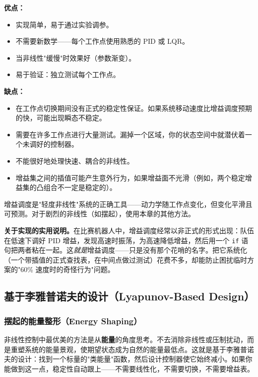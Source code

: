 \textbf{优点：}
\begin{itemize}[nosep]
    \item 实现简单，易于通过实验调参。
    \item 不需要新数学——每个工作点使用熟悉的 PID 或 LQR。
    \item 当非线性"缓慢"时效果好（参数渐变）。
    \item 易于验证：独立测试每个工作点。
\end{itemize}

\textbf{缺点：}
\begin{itemize}[nosep]
    \item 在工作点切换期间没有正式的稳定性保证。如果系统移动速度比增益调度预期的快，可能出现瞬态不稳定。
    \item 需要在许多工作点进行大量测试。漏掉一个区域，你的状态空间中就潜伏着一个未调好的控制器。
    \item 不能很好地处理快速、耦合的非线性。
    \item 增益集之间的插值可能产生意外行为，如果增益面不光滑（例如，两个稳定增益集的凸组合不一定是稳定的）。
\end{itemize}

增益调度是"轻度非线性"系统的正确工具——动力学随工作点变化，但变化平滑且可预测。对于剧烈的非线性（如摆起），使用本章的其他方法。

\textbf{关于实现的实用说明。}在比赛机器人中，增益调度经常以非正式的形式出现：队伍在低速下调好 PID 增益，发现高速时振荡，为高速降低增益，然后用一个 \texttt{if} 语句把两者粘在一起。这\textit{就是}增益调度——只是没有那个花哨的名字。把它系统化（一个带插值的正式查找表，在中间点做过测试）花费不多，却能防止困扰临时方案的"60\% 速度时的奇怪行为"问题。

\subsection{基于李雅普诺夫的设计（Lyapunov-Based Design）}

\subsubsection{摆起的能量整形（Energy Shaping）}

非线性控制中最优美的方法是从\textbf{能量}的角度思考。不去消除非线性或压制扰动，而是重塑系统的能量景观，使期望状态成为自然的能量最低点。这就是基于李雅普诺夫的设计：找到一个标量的"类能量"函数，然后设计控制器使它始终减小。如果你能做到这一点，稳定性自动跟上——不需要线性化，不需要切换，不需要增益表。

